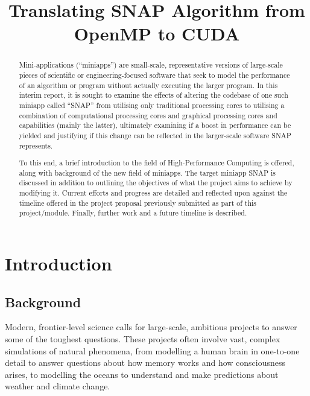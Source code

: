 \documentclass[conference]{IEEEtran}
\begin{document}
\title{Translating SNAP Algorithm from OpenMP to CUDA}

\author{
}

\maketitle


\begin{abstract}

Mini-applications (``miniapps'') are small-scale, representative versions of large-scale pieces of scientific or engineering-focused software that seek to model the performance of an algorithm or program without actually executing the larger program. In this interim report, it is sought to examine the effects of altering the codebase of one such miniapp called ``SNAP'' from utilising only traditional processing cores to utilising a combination of computational processing cores and graphical processing cores and capabilities (mainly the latter), ultimately examining if a boost in performance can be yielded and justifying if this change can be reflected in the larger-scale software SNAP represents.

To this end, a brief introduction to the field of High-Performance Computing is offered, along with background of the new field of miniapps. The target miniapp SNAP is discussed in addition to outlining the objectives of what the project aims to achieve by modifying it. Current efforts and progress are detailed and reflected upon against the timeline offered in the project proposal previously submitted as part of this project/module. Finally, further work and a future timeline is described.

\end{abstract}


\section{Introduction}

\subsection{Background}

Modern, frontier-level science calls for large-scale, ambitious projects to answer some of the toughest questions. These projects often involve vast, complex simulations of natural phenomena, from modelling a human brain in one-to-one detail to answer questions about how memory works and how consciousness arises, to modelling the oceans to understand and make predictions about weather and climate change.
\end{document}
